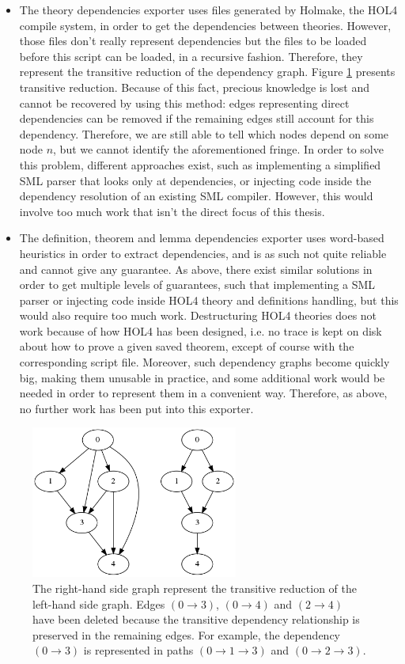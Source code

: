 \documentclass{kththesis}
\begin{document}
{\begin{itemize}
	\item The theory dependencies exporter uses files generated by Holmake, the HOL4 compile system, in order to get the dependencies between theories. However, those files don't really represent dependencies but the files to be loaded before this script can be loaded, in a recursive fashion. Therefore, they represent the transitive reduction of the dependency graph. Figure \ref{transitive-reduction} presents transitive reduction. Because of this fact, precious knowledge is lost and cannot be recovered by using this method: edges representing direct dependencies can be removed if the remaining edges still account for this dependency. Therefore, we are still able to tell which nodes depend on some node $n$, but we cannot identify the aforementioned fringe. In order to solve this problem, different approaches exist, such as implementing a simplified SML parser that looks only at dependencies, or injecting code inside the dependency resolution of an existing SML compiler. However, this would involve too much work that isn't the direct focus of this thesis.
	\item The definition, theorem and lemma dependencies exporter uses word-based heuristics in order to extract dependencies, and is as such not quite reliable and cannot give any guarantee. As above, there exist similar solutions in order to get multiple levels of guarantees, such that implementing a SML parser or injecting code inside HOL4 theory and definitions handling, but this would also require too much work. Destructuring HOL4 theories does not work because of how HOL4 has been designed, i.e. no trace is kept on disk about how to prove a given saved theorem, except of course with the corresponding script file. Moreover, such dependency graphs become quickly big, making them unusable in practice, and some additional work would be needed in order to represent them in a convenient way. Therefore, as above, no further work has been put into this exporter.
\end{itemize}

\begin{figure}[p]
	\includegraphics[height=5cm]{figures/transitive-reduction.png}
	\centering
	\caption{The right-hand side graph represent the transitive reduction of the left-hand side graph. Edges $(0 \rightarrow 3)$, $(0 \rightarrow 4)$ and $(2 \rightarrow 4)$ have been deleted because the transitive dependency relationship is preserved in the remaining edges. For example, the dependency $(0 \rightarrow 3)$ is represented in paths $(0 \rightarrow 1  \rightarrow 3)$ and $(0 \rightarrow 2 \rightarrow 3)$.}
	\label{transitive-reduction}
\end{figure}

}
\end{document}
